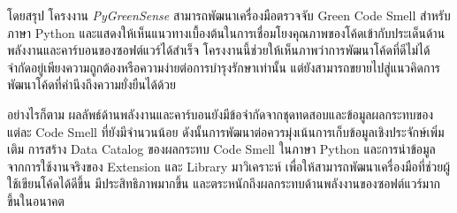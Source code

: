 โดยสรุป โครงงาน \textit{PyGreenSense} สามารถพัฒนาเครื่องมือตรวจจับ Green Code Smell สำหรับภาษา Python และแสดงให้เห็นแนวทางเบื้องต้นในการเชื่อมโยงคุณภาพของโค้ดเข้ากับประเด็นด้านพลังงานและคาร์บอนของซอฟต์แวร์ได้สำเร็จ โครงงานนี้ช่วยให้เห็นภาพว่าการพัฒนาโค้ดที่ดีไม่ได้จำกัดอยู่เพียงความถูกต้องหรือความง่ายต่อการบำรุงรักษาเท่านั้น แต่ยังสามารถขยายไปสู่แนวคิดการพัฒนาโค้ดที่คำนึงถึงความยั่งยืนได้ด้วย

อย่างไรก็ตาม ผลลัพธ์ด้านพลังงานและคาร์บอนยังมีข้อจำกัดจากชุดทดสอบและข้อมูลผลกระทบของแต่ละ Code Smell ที่ยังมีจำนวนน้อย ดังนั้นการพัฒนาต่อควรมุ่งเน้นการเก็บข้อมูลเชิงประจักษ์เพิ่มเติม การสร้าง Data Catalog ของผลกระทบ Code Smell ในภาษา Python และการนำข้อมูลจากการใช้งานจริงของ Extension และ Library มาวิเคราะห์ เพื่อให้สามารถพัฒนาเครื่องมือที่ช่วยผู้ใช้เขียนโค้ดได้ดีขึ้น มีประสิทธิภาพมากขึ้น และตระหนักถึงผลกระทบด้านพลังงานของซอฟต์แวร์มากขึ้นในอนาคต
